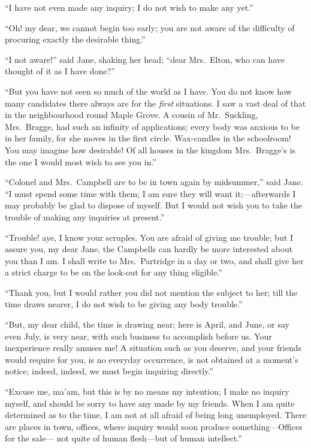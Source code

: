 ``I have not even made any inquiry; I do not wish to make any yet.''

``Oh! my dear, we cannot begin too early; you are not aware
of the difficulty of procuring exactly the desirable thing.''

``I not aware!'' said Jane, shaking her head; ``dear Mrs.\ Elton,
who can have thought of it as I have done?''

``But you have not seen so much of the world as I have.  You do not
know how many candidates there always are for the \emph{first} situations.
I saw a vast deal of that in the neighbourhood round Maple Grove.
A cousin of Mr.\ Suckling, Mrs.\ Bragge, had such an infinity
of applications; every body was anxious to be in her family,
for she moves in the first circle.  Wax-candles in the schoolroom!
You may imagine how desirable!  Of all houses in the kingdom
Mrs.\ Bragge's is the one I would most wish to see you in.''

``Colonel and Mrs.\ Campbell are to be in town again by midsummer,''
said Jane.  ``I must spend some time with them; I am sure they will
want it;---afterwards I may probably be glad to dispose of myself.
But I would not wish you to take the trouble of making any inquiries
at present.''

``Trouble! aye, I know your scruples.  You are afraid of giving
me trouble; but I assure you, my dear Jane, the Campbells can
hardly be more interested about you than I am.  I shall write
to Mrs.\ Partridge in a day or two, and shall give her a strict
charge to be on the look-out for any thing eligible.''

``Thank you, but I would rather you did not mention the subject
to her; till the time draws nearer, I do not wish to be giving
any body trouble.''

``But, my dear child, the time is drawing near; here is April,
and June, or say even July, is very near, with such business
to accomplish before us.  Your inexperience really amuses me!
A situation such as you deserve, and your friends would require for you,
is no everyday occurrence, is not obtained at a moment's notice;
indeed, indeed, we must begin inquiring directly.''

``Excuse me, ma'am, but this is by no means my intention; I make no
inquiry myself, and should be sorry to have any made by my friends.
When I am quite determined as to the time, I am not at all afraid
of being long unemployed.  There are places in town, offices,
where inquiry would soon produce something---Offices for the sale---%
not quite of human flesh---but of human intellect.''

